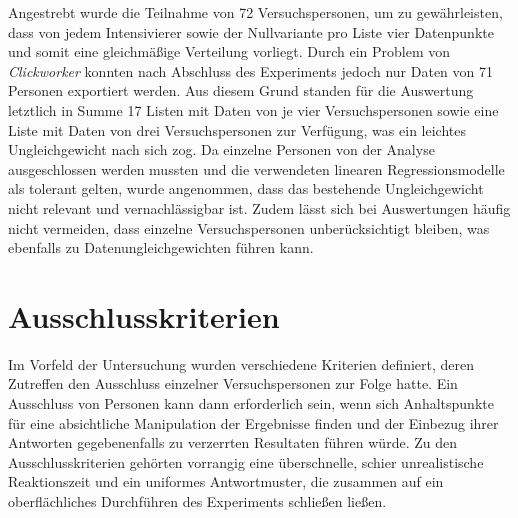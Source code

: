 Angestrebt wurde die Teilnahme von 72 Versuchspersonen, um zu gewährleisten, dass von jedem Intensivierer sowie der Nullvariante pro Liste vier Datenpunkte und somit eine gleichmäßige Verteilung vorliegt. Durch ein Problem von \textit{Clickworker} konnten nach Abschluss des Experiments jedoch nur Daten von 71 Personen exportiert werden. Aus diesem Grund standen für die Auswertung letztlich in Summe 17 Listen mit Daten von je vier Versuchspersonen sowie eine Liste mit Daten von drei Versuchspersonen zur Verfügung, was ein leichtes Ungleichgewicht nach sich zog. Da einzelne Personen von der Analyse ausgeschlossen werden mussten und die verwendeten linearen Regressionsmodelle als tolerant gelten, wurde angenommen, dass das bestehende Ungleichgewicht nicht relevant und vernachlässigbar ist. Zudem lässt sich bei Auswertungen häufig nicht vermeiden, dass einzelne Versuchspersonen unberücksichtigt bleiben, was ebenfalls zu Datenungleichgewichten führen kann.




\section{Ausschlusskriterien}
Im Vorfeld der Untersuchung wurden verschiedene Kriterien definiert, deren Zutreffen den Ausschluss einzelner Versuchspersonen zur Folge hatte. Ein Ausschluss von Personen kann dann erforderlich sein, wenn sich Anhaltspunkte für eine absichtliche Manipulation der Ergebnisse finden und der Einbezug ihrer Antworten gegebenenfalls zu verzerrten Resultaten führen würde. Zu den Ausschlusskriterien gehörten vorrangig eine überschnelle, schier unrealistische Reaktionszeit und ein uniformes Antwortmuster, die zusammen auf ein oberflächliches Durchführen des Experiments {schließen ließen}.


